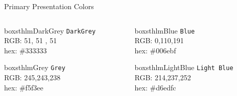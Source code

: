 \documentclass[newPxFont]{beamer}
\begin{document}
\begin{frame}[c]{Primary Presentation Colors}

\begin{columns}[c]

\begin{column}{0.23\textwidth}
\begin{beamercolorbox}[wd=\linewidth,ht=10ex,dp=3ex]{boxsthlmDarkGrey}
\centering
	\texttt{DarkGrey}\\
	\vspace{1em}
	\tiny{RGB:  51, 51 , 51} \\
	\tiny{hex: \#333333}
\end{beamercolorbox}

\vspace{3em}

\begin{beamercolorbox}[wd=\linewidth,ht=10ex,dp=3ex]{boxsthlmGrey}
\centering
	\texttt{Grey}\\
	\vspace{1em}
	\tiny{RGB:  245,243,238} \\
	\tiny{hex: \#f5f3ee}
\end{beamercolorbox}

\end{column}

\begin{column}{0.23\textwidth}

\begin{beamercolorbox}[wd=\linewidth,ht=10ex,dp=3ex]{boxsthlmBlue}
\centering
	\texttt{Blue}\\
	\vspace{1em}
	\tiny{RGB:  0,110,191} \\
	\tiny{hex: \#006ebf}
\end{beamercolorbox}

\vspace{3em}

\begin{beamercolorbox}[wd=\linewidth,ht=10ex,dp=3ex]{boxsthlmLightBlue}
\centering
	\texttt{Light Blue}\\
	\vspace{1em}
	\tiny{RGB:  214,237,252} \\
	\tiny{hex: \#d6edfc}
\end{beamercolorbox}
\end{column}


\end{columns}
\end{frame}
\end{document}
